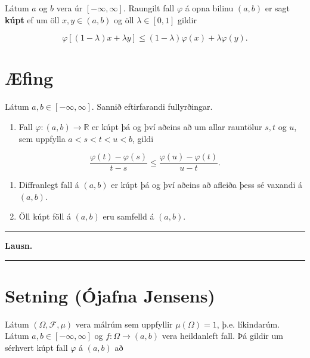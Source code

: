 \documentclass[]{book}
\providecommand{\tightlist}{%
  \setlength{\itemsep}{0pt}\setlength{\parskip}{0pt}}
\begin{document}
Látum \(a\) og \(b\) vera úr \([-\infty,\infty]\). Raungilt fall \(\varphi\) á opna bilinu \((a,b)\) er sagt \textbf{kúpt} ef um öll \(x,y\in(a,b)\) og öll \(\lambda\in[0,1]\) gildir

\[
\varphi[(1-\lambda)x + \lambda y] \leq (1 - \lambda)\varphi(x) + \lambda\varphi(y).
\]

\hypertarget{fing-3}{%
\section*{Æfing}\label{fing-3}}

Látum \(a,b\in[-\infty,\infty]\). Sannið eftirfarandi fullyrðingar.

\begin{enumerate}
\def\labelenumi{\arabic{enumi}.}
\tightlist
\item
  Fall \(\varphi:(a,b)\rightarrow\mathbb R\) er kúpt þá og því aðeins að um allar rauntölur \(s,t\) og \(u\), sem uppfylla \(a<s<t<u<b\), gildi
\end{enumerate}

\[
\frac{\varphi(t) - \varphi(s)}{t - s} \leq \frac{\varphi(u) - \varphi(t)}{u - t}.
\]

\begin{enumerate}
\def\labelenumi{\arabic{enumi}.}
\setcounter{enumi}{1}
\item
  Diffranlegt fall á \((a,b)\) er kúpt þá og því aðeins að afleiða þess sé vaxandi á \((a,b)\).
\item
  Öll kúpt föll á \((a,b)\) eru samfelld á \((a,b)\).
\end{enumerate}

\begin{center}\rule{0.5\linewidth}{\linethickness}\end{center}

\textbf{Lausn.}

\begin{center}\rule{0.5\linewidth}{\linethickness}\end{center}

\hypertarget{setning-ojafna-jensens}{%
\section*{Setning (Ójafna Jensens)}\label{setning-ojafna-jensens}}

Látum \((\Omega,\mathcal F,\mu)\) vera málrúm sem uppfyllir \(\mu(\Omega)=1\), þ.e. líkindarúm. Látum \(a,b\in[-\infty,\infty]\) og \(f:\Omega\rightarrow(a,b)\) vera heildanleft fall. Þá gildir um sérhvert kúpt fall \(\varphi\) á \((a,b)\) að
\end{document}
